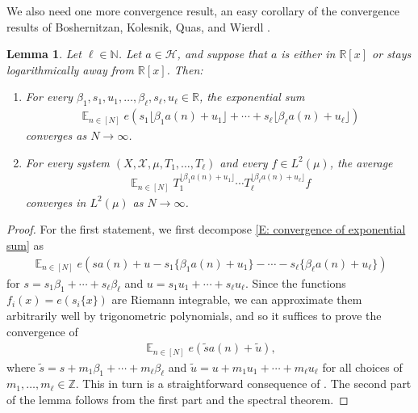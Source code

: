 \documentclass[11pt]{amsart}
\newtheorem{lemma}{Lemma}[section]
\theoremstyle{definition}
\DeclareMathOperator*{\E}{\mathbb{E}}
\newcommand{\N}{{\mathbb N}}
\newcommand{\R}{{\mathbb R}}
\newcommand{\Z}{{\mathbb Z}}
\newcommand{\CH}{{\mathcal H}}
\newcommand{\CX}{{\mathcal X}}
\newcommand{\1}{{\mathbf{1}}}
\newcommand{\brac}[1]{\mathopen{}\left( #1 \mathclose{}\right)}
\newcommand{\sfloor}[1]{{\lfloor #1 \rfloor}}
\newcommand{\srem}[1]{ \{ #1 \}}
\begin{document}
We also need one more convergence result, an easy corollary of the convergence results of Boshernitzan, Kolesnik, Quas, and Wierdl \cite{BKQW05}.
\begin{lemma}\label{L: convergence of exp sum}
    Let $\ell\in\N$. Let $a\in\CH$, and suppose that $a$ is either in $\R[x]$ or stays logarithmically away from $\R[x]$. Then:
    \begin{enumerate}
        \item For every $\beta_1, s_1, u_1, \ldots, \beta_\ell, s_\ell, u_\ell\in\R$, the exponential sum
        \begin{align}\label{E: convergence of exponential sum}
        \E_{n\in[N]}e\brac{s_1\sfloor{\beta_1 a(n)+u_1} + \cdots + s_\ell\sfloor{\beta_\ell a(n)+u_\ell}}    
        \end{align}
         converges as $N\to\infty$.
        \item For every system $(X, \CX, \mu, T_1, \ldots, T_\ell)$ and every $f\in L^2(\mu)$, the average
        \begin{align*}
            \E_{n\in[N]}T_1^{\sfloor{\beta_1 a(n)+u_1}} \cdots T_\ell^{\sfloor{\beta_\ell a(n)+u_\ell}}f
        \end{align*}
        converges in $L^2(\mu)$ as $N\to\infty$.
    \end{enumerate}
\end{lemma}
\begin{proof}
    For the first statement, we first decompose \eqref{E: convergence of exponential sum} as
    \begin{align*}
        \E_{n\in[N]}e\brac{s a(n) + u - s_1\srem{\beta_1 a(n)+u_1} - \cdots - s_\ell\srem{\beta_\ell a(n)+u_\ell}}
    \end{align*}
    for $s = s_1 \beta_1 + \cdots + s_\ell\beta_\ell$ and $u = s_1 u_1 + \cdots + s_\ell u_\ell$. Since the functions $f_i(x) = e(s_i\srem{x})$ are Riemann integrable, we can approximate them arbitrarily well by trigonometric polynomials, and so it suffices to prove the convergence of 
    \begin{align*}
        \E_{n\in[N]}e\brac{\tilde{s}a(n) + \tilde{u}},
    \end{align*}
    where $\tilde{s} = s + m_1 \beta_1 + \cdots + m_\ell \beta_\ell$ and $\tilde{u}= u + m_1 u_1 + \cdots + m_\ell u_\ell$ for all choices of $m_1, \ldots, m_\ell\in\Z$. This in turn is a straightforward consequence of \cite[Theorem A]{BKQW05}. The second part of the lemma follows from the first part and the spectral theorem.
\end{proof}
\end{document}
